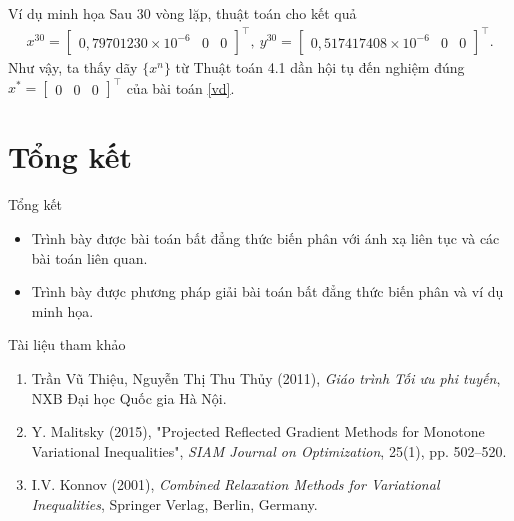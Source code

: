 \documentclass[aspectratio=169]{beamer}
\theoremstyle{plain}
\theoremstyle{definition}
\theoremstyle{remark}
\begin{document}
\begin{frame}{Ví dụ minh họa}
Sau 30 vòng lặp, thuật toán cho kết quả
\begin{gather*}
    x^{30} = \begin{bmatrix}
    0,79701230\times10^{-6} & 0 & 0
    \end{bmatrix}^\top,\
    y^{30} = \begin{bmatrix}
    0,517417408\times10^{-6} & 0 & 0
    \end{bmatrix}^\top.
\end{gather*}
Như vậy, ta thấy dãy $\{x^n\}$ từ Thuật toán 4.1 dần hội tụ đến nghiệm đúng $x^*=\begin{bmatrix}0&0&0\end{bmatrix}^\top$ của bài toán \eqref{vd}.
\end{frame}
\section{Tổng kết}
\begin{frame}{Tổng kết}\pause
\begin{itemize}
    \item Trình bày được bài toán bất đẳng thức biến phân với ánh xạ liên tục và các bài toán liên quan.
    \item Trình bày được phương pháp giải bài toán bất đẳng thức biến phân và ví dụ minh họa.
\end{itemize}    
\end{frame}

\begin{frame}{Tài liệu tham khảo}
\begin{enumerate}
    \item Trần Vũ Thiệu, Nguyễn Thị Thu Thủy (2011), {\it Giáo trình Tối ưu phi tuyến}, NXB Đại học Quốc gia Hà Nội.
    \item Y. Malitsky (2015), "Projected Reflected Gradient Methods for Monotone Variational Inequalities", {\it SIAM Journal on Optimization}, 25(1), pp. 502--520.
    \item I.V. Konnov (2001), {\it Combined Relaxation Methods for Variational Inequalities}, Springer Verlag, Berlin, Germany.
\end{enumerate}
    
\end{frame}
\end{document}
